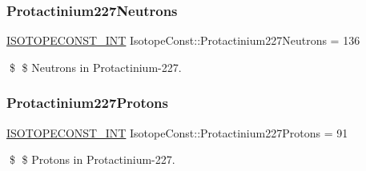 \subsubsection{\texorpdfstring{Protactinium227\+Neutrons}{Protactinium227Neutrons}}
{\footnotesize\ttfamily \mbox{\hyperlink{group___isotope_const-_macros_ga5f18360b3e99483a35c32d789e62621c}{I\+S\+O\+T\+O\+P\+E\+C\+O\+N\+S\+T\+\_\+\+I\+NT}} Isotope\+Const\+::\+Protactinium227\+Neutrons = 136}

\$ \$ Neutrons in Protactinium-\/227. \mbox{\label{group___isotope_const-_protactinium-_pa227_gad4eba5ab9613e4eda2cefffce4d8f06e}} 
\subsubsection{\texorpdfstring{Protactinium227\+Protons}{Protactinium227Protons}}
{\footnotesize\ttfamily \mbox{\hyperlink{group___isotope_const-_macros_ga5f18360b3e99483a35c32d789e62621c}{I\+S\+O\+T\+O\+P\+E\+C\+O\+N\+S\+T\+\_\+\+I\+NT}} Isotope\+Const\+::\+Protactinium227\+Protons = 91}

\$ \$ Protons in Protactinium-\/227. 
